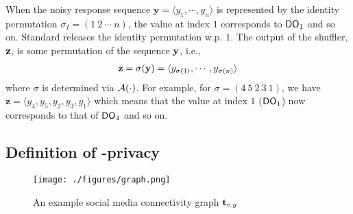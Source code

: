 When the noisy response sequence $\mathbf{y}=\langle y_1, \cdots, y_n\rangle$ is represented by the identity permutation $\sigma_{I}=(1 \: 2 \: \cdots \: n)$, the value at index $1$ corresponds to $\textsf{DO}_1$ and so on. Standard \ldp releases the identity permutation w.p. 1. The output of the shuffler, $\bf{z}$, is some permutation of the sequence $\bf{y}$, i.e.,
\begin{align*}
\mathbf{z}=\sigma(\mathbf{y})=
\langle y_{\sigma(1)},\cdots,y_{\sigma(n)}\rangle
\end{align*}
where $\sigma$ is determined via $\mathcal{A}(\cdot)$. For example, for $\sigma=(4 \: 5\: 2 \:3 \: 1)$, we have $\mathbf{z}=\langle y_4, y_5, y_2, y_3, y_1\rangle$ which means that the value at index $1$ ($\textsf{DO}_1$) now corresponds to that of $\textsf{DO}_4$ and so on.

   \vspace{-0.1cm}
\subsection{Definition of \name-privacy}\label{sec:privacy:def}
 \vspace{-0.3cm}
 
 \begin{wrapfigure}{r}{0.3\linewidth}
    \centering
    \vspace{-1.5em}
    \texttt{[image: ./figures/graph.png]}
    \vspace{-1.25em}
    \caption{An example social media connectivity graph $\mathbf{t}_{e.g}$}
    \vspace{-2em}
    \label{fig:example}
\end{wrapfigure}
 
